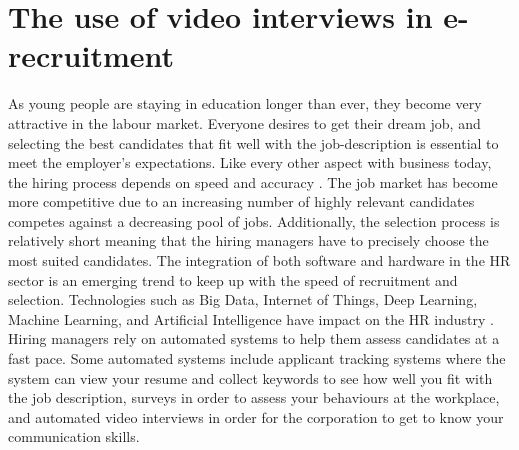 \section{The use of video interviews in e-recruitment}
As young people are staying in education longer than ever, they become very attractive in the labour market. Everyone desires to get their dream job, and selecting the best candidates that fit well with the job-description is essential to meet the employer's expectations. Like every other aspect with business today, the hiring process depends on speed and accuracy \cite{hiring-process-Sołek-BorowskaWilczewska+2018+25+33}. The job market has become more competitive due to an increasing number of highly relevant candidates competes against a decreasing pool of jobs. Additionally, the selection process is relatively short meaning that the hiring managers have to precisely choose the most suited candidates. The integration of both software and hardware in the HR sector is an emerging trend to keep up with the speed of recruitment and selection. Technologies such as Big Data, Internet of Things, Deep Learning, Machine Learning, and Artificial Intelligence have impact on the HR industry \cite{robotic-process-nawaz2019robotic}. Hiring managers rely on automated systems to help them assess candidates at a fast pace. Some automated systems include  applicant tracking systems \cite{ATS2015} where the system can view your resume and collect keywords to see how well you fit with the job description, surveys \cite{ONEILL2013162} in order to assess your behaviours at the workplace, and automated video interviews \cite{Chen2017_video_interview} in order for the corporation to get to know your communication skills.   \\


